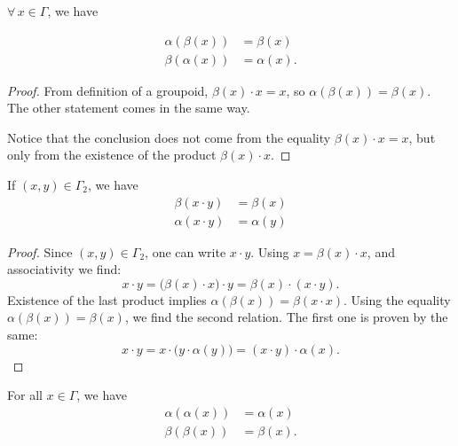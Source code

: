 \begin{lemma}
$\forall\,x\in\Gamma$, we have 

\begin{subequations}
\begin{align}
\alpha(\beta(x))&=\beta(x)\\
\beta(\alpha(x))&=\alpha(x).
\end{align}
\end{subequations}
\end{lemma}

\begin{proof}
From definition of a groupoid, $\beta(x)\cdot x=x$, so $\alpha(\beta(x))=\beta(x)$. The other statement comes in the same way.

Notice that the conclusion does not come from the equality $\beta(x)\cdot x=x$, but only from the existence of the product $\beta(x)\cdot x$.
\end{proof}

\begin{lemma}
If $(x,y)\in\Gamma_{2}$, we have
\begin{subequations}
\begin{align}
\beta(x\cdot y)&=\beta(x)\\
\alpha(x\cdot y)&=\alpha(y)
\end{align}
\end{subequations}

\end{lemma}

\begin{proof}
Since $(x,y)\in \Gamma_{2}$, one can write $x\cdot y$. Using $x=\beta(x)\cdot x$, and associativity we find:
\[ 
  x\cdot y=\big( \beta(x)\cdot x \big)\cdot y=\beta(x)\cdot(x\cdot y).	
\]
Existence of the last product implies $\alpha(\beta(x))=\beta(x\cdot x)$. Using the equality $\alpha(\beta(x))=\beta(x)$, we find the second relation. The first one is proven by the same:
\[ 
  x\cdot y=x\cdot \big( y\cdot\alpha(y) \big)=(x\cdot y)\cdot \alpha(x).
\]

\end{proof}

\begin{lemma}
For all $x\in\Gamma$, we have
\begin{subequations}
\begin{align}
  \alpha(\alpha(x))&=\alpha(x)\\
\beta(\beta(x))&=\beta(x).
\end{align}
\end{subequations}
\end{lemma}

